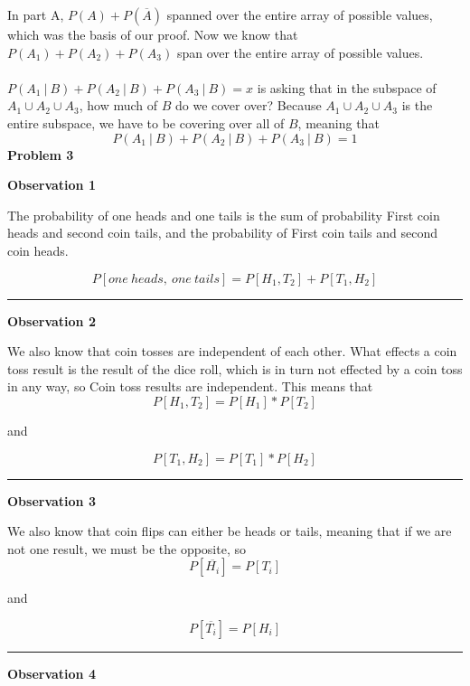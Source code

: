 \documentclass[11pt]{article}
\begin{document}
\begin{enumerate}
In part A, $P(A) + P(\overline{A})$ spanned over the entire array of possible values, which was the basis of our proof.  Now we know that $P(A_1) + P(A_2) + P(A_3)$ span over the entire array of possible values. \\ \\
$P(A_1\ |\ B) + P(A_2\ |\ B) + P(A_3\ |\ B) = x$ is asking that in the subspace of $A_1 \cup A_2 \cup A_3$, how much of $B$ do we cover over?  Because $A_1 \cup A_2 \cup A_3$ is the entire subspace, we have to be covering over all of $B$, meaning that $$P(A_1\ |\ B) + P(A_2\ |\ B) + P(A_3\ |\ B) = 1$$
\newpage
\textbf{Problem 3}
\\
\begin{center}
\textbf{Observation 1}
\end{center}
The probability of one heads and one tails is the sum of probability First coin heads and second coin tails, and the probability of First coin tails and second coin heads.

$$P[one\ heads,\ one\ tails] = P[H_1,T_2] + P[T_1, H_2]$$
\noindent\rule{20cm}{0.4pt}
\begin{center}
\textbf{Observation 2}
\end{center}
We also know that coin tosses are independent of each other.  What effects a coin toss result is the result of the dice roll, which is in turn not effected by a coin toss in any way, so Coin toss results are independent. This means that 
\\

$$ P[H_1, T_2] = P[H_1] * P[T_2]$$
\begin{center}
and
\end{center}
$$ P[T_1, H_2] = P[T_1] * P[H_2]$$
\noindent\rule{20cm}{0.4pt}
\begin{center}
\textbf{Observation 3}
\end{center}
We also know that coin flips can either be heads or tails, meaning that if we are not one result, we must be the opposite, so 
$$P[\overline{H_i}] = P[T_i]$$
\begin{center}
and
\end{center}
$$P[\overline{T_i}] = P[H_i]$$
\noindent\rule{20cm}{0.4pt}
\begin{center}
\textbf{Observation 4}
\end{center}


\end{enumerate}
\end{document}

